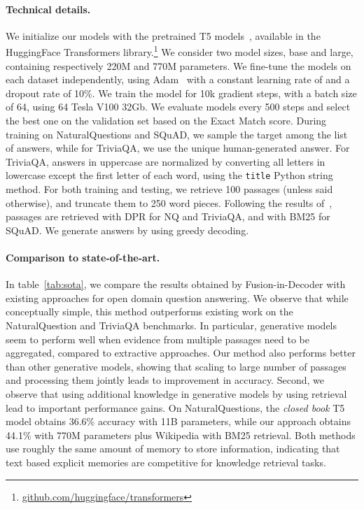 \documentclass[11pt,a4paper]{article}
\begin{document}
\paragraph{Technical details.}
We initialize our models with the pretrained T5 models~\citep{raffel2019exploring}, available in the HuggingFace Transformers library.\footnote{\url{github.com/huggingface/transformers}}
We consider two model sizes, base and large, containing respectively 220M and 770M parameters.
We fine-tune the models on each dataset independently, using Adam~\citep{kingma2014adam} with a constant learning rate of  and a dropout rate of 10\%.
We train the model for 10k gradient steps, with a batch size of 64, using 64 Tesla V100 32Gb.
We evaluate models every 500 steps and select the best one on the validation set based on the Exact Match score.
During training on NaturalQuestions and SQuAD, we sample the target among the list of answers, while for TriviaQA, we use the unique human-generated answer. For TriviaQA, answers in uppercase are normalized by converting all letters in lowercase except the first letter of each word, using the \texttt{title} Python string method.
For both training and testing, we retrieve 100 passages (unless said otherwise), and truncate them to 250 word pieces.
Following the results of~\citet{karpukhin2020dense}, passages are retrieved with DPR for NQ and TriviaQA, and with BM25 for SQuAD.
We generate answers by using greedy decoding.

\paragraph{Comparison to state-of-the-art.}
In table~\ref{tab:sota}, we compare the results obtained by Fusion-in-Decoder with existing approaches for open domain question answering.
We observe that while conceptually simple, this method outperforms existing work on the NaturalQuestion and TriviaQA benchmarks.
In particular, generative models seem to perform well when evidence from multiple passages need to be aggregated, compared to extractive approaches.
Our method also performs better than other generative models, showing that scaling to large number of passages and processing them jointly leads to improvement in accuracy.
Second, we observe that using additional knowledge in generative models by using retrieval lead to important performance gains.
On NaturalQuestions, the \emph{closed book} T5 model obtains 36.6\% accuracy with 11B parameters, 
while our approach obtains 44.1\% with 770M parameters plus Wikipedia with BM25 retrieval.
Both methods use roughly the same amount of memory to store information, indicating that text based explicit memories are competitive for knowledge retrieval tasks.
\end{document}
